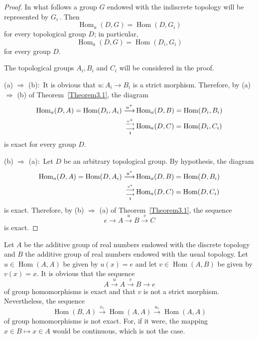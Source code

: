 \documentclass[12pt]{amsart}
\theoremstyle{theorem}
\theoremstyle{definition}
\theoremstyle{remark} \theoremstyle{question} \theoremstyle{example}
\def\Hom{\operatorname{{Hom}}}
\begin{document}
\begin{proof}
In what follows a group $G$ endowed with the indiscrete topology will be
represented by $G_i$\,. Then
$$
\Hom_a(D,G) = \Hom(D,G_i)
$$
for every topological group $D$; in particular,
$$
\Hom_a(D,G) = \Hom(D_i,G_i)
$$
for every group $D$.

The topological groups $A_i, B_i$ and $C_i$ will be considered in the proof.

\smallskip

\noindent (a) $\Rightarrow$ (b):\, It is obvious that $u\colon A_i \to B_i$ is a strict morphism. Therefore, by
(a) $\Rightarrow$ (b) of Theorem~\ref{Theorem3.1}, the diagram
\begin{align*}
\Hom_a(D,A) = \Hom(D_i,A_i) \overset{u^+}{\longrightarrow} &\Hom_a(D,B) = \Hom(D_i,B_i)\\
{}^{\overset{v^+}{\longrightarrow}}_{\underset{\bf 1}{\longrightarrow}} &\Hom_a(D,C) = \Hom(D_i,C_i)
\end{align*}
is exact for every group $D$.

\smallskip

\noindent (b) $\Rightarrow$ (a):\, Let $D$ be an arbitrary topological group.
By hypothesis, the diagram
\begin{align*}
\Hom_a(D,A) = \Hom(D,A_i) \overset{u^*}{\longrightarrow} &\Hom_a(D,B) = \Hom(D,B_i)\\
{}^{\overset{v^*}{\longrightarrow}}_{\underset{\bf 1}{\longrightarrow}} &\Hom_a(D,C) = \Hom(D,C_i)
\end{align*}
is exact. Therefore, by (b) $\Rightarrow$ (a) of Theorem~\ref{Theorem3.1},
the sequence
$$
e \longrightarrow A \overset{u}{\longrightarrow} B \overset{v}{\longrightarrow} C
$$
is exact.
\end{proof}

Let $A$ be the additive group of real numbers endowed with the discrete
topology and $B$ the additive group of real numbers endowed with the usual
topology. Let $u \in \Hom(A,A)$ be given by $u(x) = e$ and let
$v \in \Hom(A,B)$ be given by $v(x) = x$. It is obvious that the sequence
$$
A \overset{u}{\longrightarrow} A \overset{v}{\longrightarrow} B \longrightarrow e
$$
of group homomorphisms is exact and that $v$ is not a strict morphism.
Nevertheless, the sequence
$$
\Hom(B,A) \overset{v_*}{\longrightarrow} \Hom(A,A)\overset{u_*}{\longrightarrow} \Hom(A,A)
$$
of group homomorphisms is not exact. For, if it were, the mapping
$x \in B \mapsto x \in A$ would be continuous, which is not the case.
\end{document}
